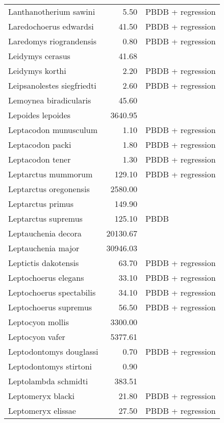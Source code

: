 \begin{table}[ht]
\begin{tabular}{lrl}
  Lanthanotherium sawini & 5.50 & PBDB + regression \\ 
  Laredochoerus edwardsi & 41.50 & PBDB + regression \\ 
  Laredomys riograndensis & 0.80 & PBDB + regression \\ 
  Leidymys cerasus & 41.68 & \cite{Tomiya2013} \\ 
  Leidymys korthi & 2.20 & PBDB + regression \\ 
  Leipsanolestes siegfriedti & 2.60 & PBDB + regression \\ 
  Lemoynea biradicularis & 45.60 & \cite{Tomiya2013} \\ 
  Lepoides lepoides & 3640.95 & \cite{Tomiya2013} \\ 
  Leptacodon munusculum & 1.10 & PBDB + regression \\ 
  Leptacodon packi & 1.80 & PBDB + regression \\ 
  Leptacodon tener & 1.30 & PBDB + regression \\ 
  Leptarctus mummorum & 129.10 & PBDB + regression \\ 
  Leptarctus oregonensis & 2580.00 & \cite{McKenna2011} \\ 
  Leptarctus primus & 149.90 & \cite{Tomiya2013} \\ 
  Leptarctus supremus & 125.10 & PBDB \\ 
  Leptauchenia decora & 20130.67 & \cite{Tomiya2013} \\ 
  Leptauchenia major & 30946.03 & \cite{Tomiya2013} \\ 
  Leptictis dakotensis & 63.70 & PBDB + regression \\ 
  Leptochoerus elegans & 33.10 & PBDB + regression \\ 
  Leptochoerus spectabilis & 34.10 & PBDB + regression \\ 
  Leptochoerus supremus & 56.50 & PBDB + regression \\ 
  Leptocyon mollis & 3300.00 & \cite{McKenna2011} \\ 
  Leptocyon vafer & 5377.61 & \cite{Tomiya2013} \\ 
  Leptodontomys douglassi & 0.70 & PBDB + regression \\ 
  Leptodontomys stirtoni & 0.90 & \cite{Stock1937} \\ 
  Leptolambda schmidti & 383.51 & \cite{Zack2005} \\ 
  Leptomeryx blacki & 21.80 & PBDB + regression \\ 
  Leptomeryx elissae & 27.50 & PBDB + regression \\ 

\end{tabular}
\end{table}
